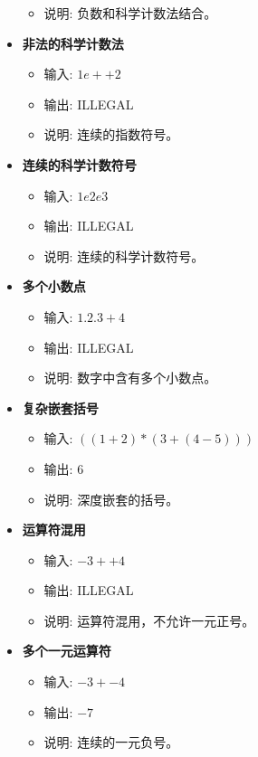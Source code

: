 \documentclass{article}
\begin{document}
\begin{itemize}
\begin{itemize}
        \item 说明: 负数和科学计数法结合。
    \end{itemize}
    \item \textbf{非法的科学计数法}
    \begin{itemize}
        \item 输入: \(1e++2\)
        \item 输出: ILLEGAL
        \item 说明: 连续的指数符号。
    \end{itemize}
    \item \textbf{连续的科学计数符号}
    \begin{itemize}
        \item 输入: \(1e2e3\)
        \item 输出: ILLEGAL
        \item 说明: 连续的科学计数符号。
    \end{itemize}
    \item \textbf{多个小数点}
    \begin{itemize}
        \item 输入: \(1.2.3 + 4\)
        \item 输出: ILLEGAL
        \item 说明: 数字中含有多个小数点。
    \end{itemize}
    \item \textbf{复杂嵌套括号}
    \begin{itemize}
        \item 输入: \(((1 + 2) * (3 + (4 - 5)))\)
        \item 输出: \(6\)
        \item 说明: 深度嵌套的括号。
    \end{itemize}
    \item \textbf{运算符混用}
    \begin{itemize}
        \item 输入: \(-3 + +4\)
        \item 输出: ILLEGAL
        \item 说明: 运算符混用，不允许一元正号。
    \end{itemize}
    \item \textbf{多个一元运算符}
    \begin{itemize}
        \item 输入: \(-3 + -4\)
        \item 输出: \(-7\)
        \item 说明: 连续的一元负号。
    \end{itemize}

\end{itemize}
\end{document}
